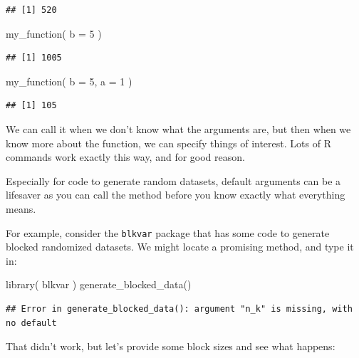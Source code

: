 \documentclass[
]{book}
\newenvironment{Shaded}{\begin{snugshade}}{\end{snugshade}}
\newcommand{\AttributeTok}[1]{\textcolor[rgb]{0.77,0.63,0.00}{#1}}
\newcommand{\DecValTok}[1]{\textcolor[rgb]{0.00,0.00,0.81}{#1}}
\newcommand{\FunctionTok}[1]{\textcolor[rgb]{0.00,0.00,0.00}{#1}}
\newcommand{\NormalTok}[1]{#1}
\begin{document}
\begin{verbatim}
## [1] 520
\end{verbatim}

\begin{Shaded}
\begin{Highlighting}[]
\FunctionTok{my\_function}\NormalTok{( }\AttributeTok{b =} \DecValTok{5}\NormalTok{ )}
\end{Highlighting}
\end{Shaded}

\begin{verbatim}
## [1] 1005
\end{verbatim}

\begin{Shaded}
\begin{Highlighting}[]
\FunctionTok{my\_function}\NormalTok{( }\AttributeTok{b =} \DecValTok{5}\NormalTok{, }\AttributeTok{a =} \DecValTok{1}\NormalTok{ )}
\end{Highlighting}
\end{Shaded}

\begin{verbatim}
## [1] 105
\end{verbatim}

We can call it when we don't know what the arguments are, but then when we know more about the function, we can specify things of interest.
Lots of R commands work exactly this way, and for good reason.

Especially for code to generate random datasets, default arguments can be a lifesaver as you can call the method before you know exactly what everything means.

For example, consider the \texttt{blkvar} package that has some code to generate blocked randomized datasets.
We might locate a promising method, and type it in:

\begin{Shaded}
\begin{Highlighting}[]
\FunctionTok{library}\NormalTok{( blkvar )}
\FunctionTok{generate\_blocked\_data}\NormalTok{()}
\end{Highlighting}
\end{Shaded}

\begin{verbatim}
## Error in generate_blocked_data(): argument "n_k" is missing, with no default
\end{verbatim}

That didn't work, but let's provide some block sizes and see what happens:
\end{document}
